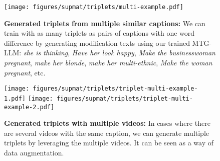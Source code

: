 \begin{figure}\centering
  \texttt{[image: figures/supmat/triplets/multi-example.pdf]}
  \caption{\textbf{Generated triplets from multiple similar captions:} We can train with as many triplets 
  as pairs of captions with one word difference by generating modification texts using our
  trained MTG-LLM:
  \colorbox{bluecolor}{\textit{she is thinking}}, 
  \colorbox{bluecolor}{\textit{Have her look happy}}, 
  \colorbox{yellowcolor}{\textit{Make the businesswoman pregnant}}, 
  \colorbox{yellowcolor}{\textit{make her blonde}}, 
  \colorbox{yellowcolor}{\textit{make her multi-ethnic}}, 
  \colorbox{yellowcolor}{\textit{Make the woman pregnant}}, etc.
  }
  \label{app:fig:triplet-multi}
\end{figure}


\begin{figure}\centering
  \texttt{[image: figures/supmat/triplets/triplet-multi-example-1.pdf]}
  \texttt{[image: figures/supmat/triplets/triplet-multi-example-2.pdf]}
  \caption{\textbf{Generated triplets with multiple videos:} 
  In cases where there are several videos with the same caption,
  we can generate multiple triplets by leveraging the multiple videos. 
  It can be seen as a way of data augmentation.}
  \label{app:fig:triplet-multi-12}
\end{figure}

